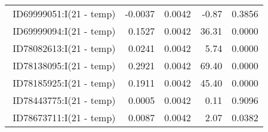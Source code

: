 \begin{table}[ht]
\begin{tabular}{rrrrr}
$$  ID69999051:I(21 - temp) & -0.0037 & 0.0042 & -0.87 & 0.3856 \\ 
  ID69999094:I(21 - temp) & 0.1527 & 0.0042 & 36.31 & 0.0000 \\ 
  ID78082613:I(21 - temp) & 0.0241 & 0.0042 & 5.74 & 0.0000 \\ 
  ID78138095:I(21 - temp) & 0.2921 & 0.0042 & 69.40 & 0.0000 \\ 
  ID78185925:I(21 - temp) & 0.1911 & 0.0042 & 45.40 & 0.0000 \\ 
  ID78443775:I(21 - temp) & 0.0005 & 0.0042 & 0.11 & 0.9096 \\ 
  ID78673711:I(21 - temp) & 0.0087 & 0.0042 & 2.07 & 0.0382 \\ 
   \hline
\end{tabular}
\end{table}
